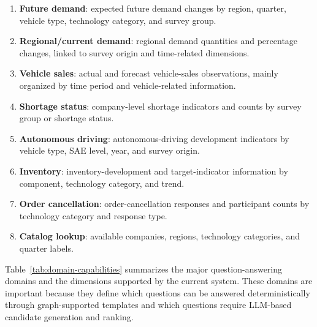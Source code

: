 \begin{enumerate}
    \item \textbf{Future demand}: expected future demand changes by region, quarter, vehicle type, technology category, and survey group.
    \item \textbf{Regional/current demand}: regional demand quantities and percentage changes, linked to survey origin and time-related dimensions.
    \item \textbf{Vehicle sales}: actual and forecast vehicle-sales observations, mainly organized by time period and vehicle-related information.
    \item \textbf{Shortage status}: company-level shortage indicators and counts by survey group or shortage status.
    \item \textbf{Autonomous driving}: autonomous-driving development indicators by vehicle type, SAE level, year, and survey origin.
    \item \textbf{Inventory}: inventory-development and target-indicator information by component, technology category, and trend.
    \item \textbf{Order cancellation}: order-cancellation responses and participant counts by technology category and response type.
    \item \textbf{Catalog lookup}: available companies, regions, technology categories, and quarter labels.
\end{enumerate}

Table~\ref{tab:domain-capabilities} summarizes the major question-answering domains and the dimensions supported by the current system. These domains are important because they define which questions can be answered deterministically through graph-supported templates and which questions require LLM-based candidate generation and ranking.

